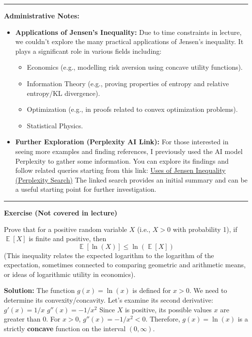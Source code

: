 \documentclass[11pt]{article}
\theoremstyle{definition}
\theoremstyle{remark}
\newenvironment{announcement}
  {\par\medskip\noindent\begin{center}\rule{\linewidth}{0.4pt}\end{center}\par\medskip\noindent\textbf{Administrative Notes:}\begin{itemize}}
  {\end{itemize}\par\medskip\noindent\begin{center}\rule{\linewidth}{0.4pt}\end{center}\medskip}
\DeclareMathOperator{\E}{\mathbb{E}} %
\begin{document}
\begin{announcement}
    \item \textbf{Applications of Jensen's Inequality:} Due to time constraints in lecture, we couldn't explore the many practical applications of Jensen's inequality. It plays a significant role in various fields including:
        \begin{itemize}
            \item Economics (e.g., modelling risk aversion using concave utility functions).
            \item Information Theory (e.g., proving properties of entropy and relative entropy/KL divergence).
            \item Optimization (e.g., in proofs related to convex optimization problems).
            \item Statistical Physics.
        \end{itemize}
    \item \textbf{Further Exploration (Perplexity AI Link):} For those interested in seeing more examples and finding references, I previously used the AI model Perplexity to gather some information. You can explore its findings and follow related queries starting from this link:
    \href{https://www.perplexity.ai/search/what-are-the-uses-of-of-jensen-uTJ3oIALRGCAxF8OIp\_Yw\#0}{Uses of Jensen Inequality (Perplexity Search)}
    The linked search provides an initial summary and can be a useful starting point for further investigation.
\end{announcement}

\hrulefill
\begin{center} \textbf{Exercise (Not covered in lecture)} \end{center}
Prove that for a positive random variable $X$ (i.e., $X > 0$ with probability 1), if $\E[X]$ is finite and positive, then
\[ \E[\ln(X)] \le \ln(\E[X]) \]
(This inequality relates the expected logarithm to the logarithm of the expectation, sometimes connected to comparing geometric and arithmetic means, or ideas of logarithmic utility in economics).

\textbf{Solution:}
The function $g(x) = \ln(x)$ is defined for $x > 0$. We need to determine its convexity/concavity. Let's examine its second derivative:
$g'(x) = 1/x$
$g''(x) = -1/x^2$
Since $X$ is positive, its possible values $x$ are greater than 0. For $x > 0$, $g''(x) = -1/x^2 < 0$. Therefore, $g(x) = \ln(x)$ is a strictly \textbf{concave} function on the interval $(0, \infty)$.
\end{document}
